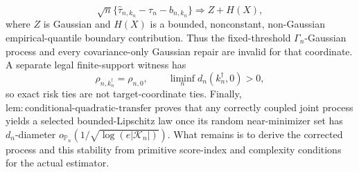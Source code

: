 \[
 \sqrt n\{\widehat\tau_{n,k_n}-\tau_n-b_{n,k_n}\}
 \Rightarrow Z+H(X),
\]
where \(Z\) is Gaussian and \(H(X)\) is a bounded, nonconstant, non-Gaussian empirical-quantile boundary contribution.  Thus the fixed-threshold \(\Gamma_n\)-Gaussian process and every covariance-only Gaussian repair are invalid for that coordinate.  A separate legal finite-support witness has
\[
 \rho_{n,k_n^{\dagger}}=\rho_{n,0},
 \qquad
 \liminf_n d_n(k_n^{\dagger},0)>0,
\]
so exact risk ties are not target-coordinate ties.  Finally, \(\mathrm{lem:conditional\text{-}quadratic\text{-}transfer}\) proves that any correctly coupled joint process yields a selected bounded-Lipschitz law once its random near-minimizer set has \(d_n\)-diameter \(o_{\mathbb P_n}(1/\sqrt{\log(e|\mathcal K_n|)})\).  What remains is to derive the corrected process and this stability from primitive score-index and complexity conditions for the actual estimator.
